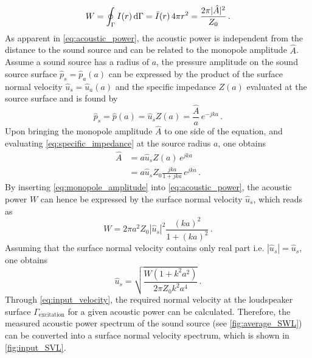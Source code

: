 {\begin{equation}
	W = \oint_{\Gamma} I(r) \dif\Gamma = \bar{I}(r)\,4\pi r^2 = \frac{2\pi |\hat{A}|^2}{Z_0}\,. \label{eq:acoustic_power}
\end{equation}
As apparent in \cref{eq:acoustic_power}, the acoustic power is independent from the distance to the sound source and can be related to the monopole amplitude $\hat{A}$. Assume a sound source has a radius of $a$, the pressure amplitude on the sound source surface $\hat{p}_s = \hat{p}_a(a)$ can be expressed by the product of the surface normal velocity $\hat{u}_s = \hat{u}_a(a)$ and the specific impedance $Z(a)$ evaluated at the source surface and is found by
\begin{equation}
	\hat{p}_s = \hat{p}(a) = \hat{u}_s Z(a) = \frac{\hat{A}}{a}\,e^{-jka}\,.
\end{equation}
Upon bringing the monopole amplitude $\hat{A}$ to one side of the equation, and evaluating \cref{eq:specific_impedance} at the source radius $a$, one obtains
\begin{align}
	\hat{A} &= a\hat{u}_s Z(a)\,e^{jka} \\
			&= a\hat{u}_s Z_0 \frac{jka}{1+jka}\,e^{jka}\,. \label{eq:monopole_amplitude}
\end{align}
By inserting \cref{eq:monopole_amplitude} into \cref{eq:acoustic_power}, the acoustic power $W$ can hence be expressed by the surface normal velocity $\hat{u}_s$, which reads as
\begin{equation}
	W = 2\pi a^2 Z_0 \left|\hat{u}_s\right|^2\frac{(ka)^2}{1+(ka)^2} \,.
\end{equation}
Assuming that the surface normal velocity contains only real part i.e. $\left|\hat{u}_s\right| = \hat{u}_s$, one obtains
\begin{equation}
	\hat{u}_s = \sqrt{\frac{W(1 + k^2a^2)}{2\pi Z_0 k^2a^4}}\,. \label{eq:input_velocity}
\end{equation}
Through \cref{eq:input_velocity}, the required normal velocity at the loudspeaker surface $\Gamma_{\text{excitation}}$ for a given acoustic power can be calculated. Therefore, the measured acoustic power spectrum of the sound source (see \cref{fig:average_SWL}) can be converted into a surface normal velocity spectrum, which is shown in \cref{fig:input_SVL}.

}
